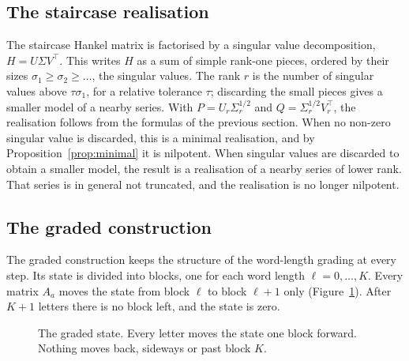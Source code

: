 \documentclass[11pt,a4paper]{article}
\theoremstyle{remark}
\begin{document}
\subsection{The staircase realisation}\label{sec:construction}
The staircase Hankel matrix is factorised by a singular value decomposition, $H=U\Sigma V^\top$.
This writes $H$ as a sum of simple rank-one pieces, ordered by their sizes $\sigma_1\ge\sigma_2\ge\dots$, the singular values.
The rank $r$ is the number of singular values above $\tau\sigma_1$, for a relative tolerance $\tau$; discarding the small pieces gives a smaller model of a nearby series.
With $P=U_r\Sigma_r^{1/2}$ and $Q=\Sigma_r^{1/2}V_r^\top$, the realisation follows from the formulas of the previous section.
When no non-zero singular value is discarded, this is a minimal realisation, and by Proposition~\ref{prop:minimal} it is nilpotent.
When singular values are discarded to obtain a smaller model, the result is a realisation of a nearby series of lower rank.
That series is in general not truncated, and the realisation is no longer nilpotent.

\subsection{The graded construction}
The graded construction keeps the structure of the word-length grading at every step.
Its state is divided into blocks, one for each word length $\ell=0,\dots,K$.
Every matrix $A_a$ moves the state from block $\ell$ to block $\ell+1$ only (Figure~\ref{fig:grades}).
After $K+1$ letters there is no block left, and the state is zero.

\begin{figure}[t]\centering
{}
\caption{The graded state. Every letter moves the state one block forward. Nothing moves back, sideways or past block $K$.}\label{fig:grades}
\end{figure}
\end{document}
